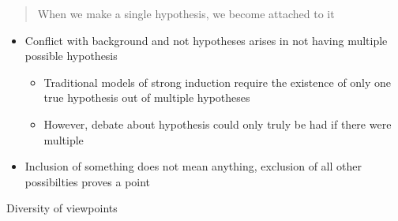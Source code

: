 \documentclass[letterpaper]{article}
\begin{document}
\begin{quote}
When we make a single hypothesis, we become attached to it
\end{quote}

\begin{itemize}
\item Conflict with background and not hypotheses arises in not having
multiple possible hypothesis

\begin{itemize}
\item Traditional models of strong induction require the existence of only
one true hypothesis out of multiple hypotheses
\item However, debate about hypothesis could only truly be had if there
were multiple
\end{itemize}

\item Inclusion of something does not mean anything, exclusion of all other
possibilties proves a point
\end{itemize}

Diversity of viewpoints
\end{document}
